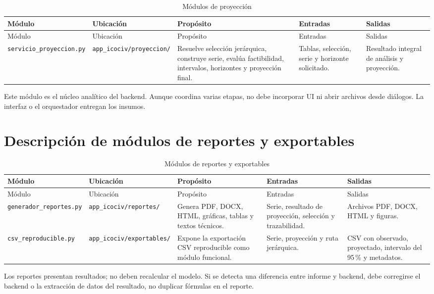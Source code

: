 \documentclass[12pt,letterpaper]{article}
\begin{document}
\begin{longtable}{p{}p{}p{}p{}p{}}
\caption{Módulos de proyección}
\label{tab:modulos_proyeccion}\\
\toprule
Módulo & Ubicación & Propósito & Entradas & Salidas \\
\midrule
\endfirsthead
\toprule
Módulo & Ubicación & Propósito & Entradas & Salidas \\
\midrule
\endhead
\texttt{servicio\_proyeccion.py} & \texttt{app\_icociv/proyeccion/} & Resuelve selección jerárquica, construye serie, evalúa factibilidad, intervalos, horizontes y proyección final. & Tablas, selección, serie y horizonte solicitado. & Resultado integral de análisis y proyección. \\
\bottomrule
\end{longtable}

Este módulo es el núcleo analítico del backend. Aunque coordina varias etapas, no debe incorporar UI ni abrir archivos desde diálogos. La interfaz o el orquestador entregan los insumos.

\section{Descripción de módulos de reportes y exportables}

\begin{longtable}{p{}p{}p{}p{}p{}}
\caption{Módulos de reportes y exportables}
\label{tab:modulos_reportes_exportables}\\
\toprule
Módulo & Ubicación & Propósito & Entradas & Salidas \\
\midrule
\endfirsthead
\toprule
Módulo & Ubicación & Propósito & Entradas & Salidas \\
\midrule
\endhead
\texttt{generador\_reportes.py} & \texttt{app\_icociv/reportes/} & Genera PDF, DOCX, HTML, gráficas, tablas y textos técnicos. & Serie, resultado de proyección, selección y trazabilidad. & Archivos PDF, DOCX, HTML y figuras. \\
\texttt{csv\_reproducible.py} & \texttt{app\_icociv/exportables/} & Expone la exportación CSV reproducible como módulo funcional. & Serie, proyección y ruta jerárquica. & CSV con observado, proyectado, intervalo del 95\,\% y metadatos. \\
\bottomrule
\end{longtable}

Los reportes presentan resultados; no deben recalcular el modelo. Si se detecta una diferencia entre informe y backend, debe corregirse el backend o la extracción de datos del resultado, no duplicar fórmulas en el reporte.
\end{document}
